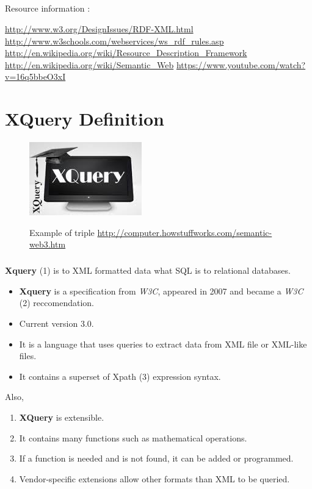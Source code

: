 \documentclass[a4paper,11pt]{report}
\begin{document}
\paragraph{}
Resource information : 

\url{http://www.w3.org/DesignIssues/RDF-XML.html}
\url{http://www.w3schools.com/webservices/ws_rdf_rules.asp}
\url{http://en.wikipedia.org/wiki/Resource_Description_Framework}
\url{http://en.wikipedia.org/wiki/Semantic_Web}
\url{https://www.youtube.com/watch?v=16q5bbeO3xI}

\chapter{XQuery Definition}

\begin{figure}[h]
	\centering
		\includegraphics{images/xquery_image.jpeg}~\\[1cm]
		\caption {Example of triple \url {http://computer.howstuffworks.com/semantic-web3.htm}}
\end{figure}


\paragraph{}
\textbf{Xquery} {\footnotesize (1)} is to XML formatted data what SQL is to
relational databases.\\

\begin{itemize}
  \item \textbf{Xquery} is a specification from \textit{W3C}, appeared in 2007 and became a \textit{W3C} {\footnotesize (2)} reccomendation.
  \item Current version 3.0.
  \item It is a language that uses queries to extract data from XML file or XML-like files.
  \item It contains a superset of Xpath {\footnotesize (3)} expression syntax.
\end{itemize}
 
 Also, \\
 
 \begin{enumerate}
  \item \textbf{XQuery} is extensible.
  \item It contains many functions such as mathematical operations.
  \item If a function is needed and is not found, it can be added or programmed.
  \item Vendor-specific extensions allow other formats than XML to be queried.
\end{enumerate}
\end{document}
